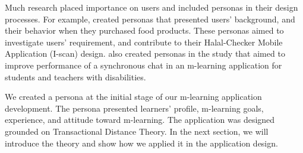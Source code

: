 \documentclass[a4paper,twoside]{article}
\begin{document}
Much research placed importance on users and included personas in their design processes. For example, \citet{rahim2014engineering} created personas that presented users' background, and their behavior when they purchased food products. These personas aimed to investigate users' requirement, and contribute to their Halal-Checker Mobile Application (I-scan) design. \citet{calvo2014user} also created personas in the study that aimed to improve performance of a synchronous chat in an m-learning application for students and teachers with disabilities. 


We created a persona at the initial stage of our m-learning application development. The persona presented learners' profile, m-learning goals, experience, and attitude toward m-learning. The application was designed grounded on Transactional Distance Theory. In the next section, we will introduce the theory and show how we applied it in the application design. 


\end{document}
